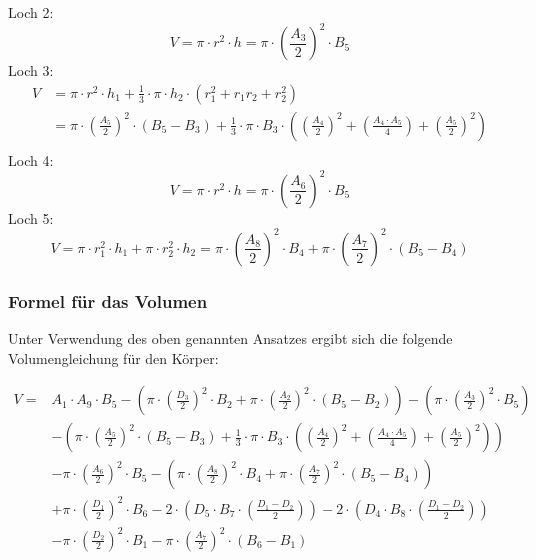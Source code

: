 Loch 2:
  \begin{equation}
    V = \pi\cdot r^{2} \cdot h = \pi \cdot \left(\frac{A_3}{2} \right)^2 \cdot B_5 
  \end{equation}
Loch 3:
  \begin{equation}
    \begin{split}
    V &= \pi\cdot r^{2} \cdot h_1 + \frac{1}{3} \cdot \pi \cdot h_2 \cdot(r_1^2 + r_1 r_2 + r_2^2) \\
    &= \pi \cdot \left(\frac{A_5}{2} \right)^2 \cdot (B_5 - B_3) + \frac{1}{3} \cdot \pi \cdot B_3 \cdot \left(\left(\frac{A_4}{2}\right)^2 + \left(\frac{A_4 \cdot A_5}{4}\right)+ \left(\frac{A_5}{2}\right)^2\right)\\
    \end{split}
  \end{equation}
Loch 4:
  \begin{equation}
     V = \pi\cdot r^{2} \cdot h = \pi \cdot \left(\frac{A_6}{2} \right)^2 \cdot B_5 
  \end{equation}
Loch 5:
  \begin{equation}
    V = \pi\cdot r_1^{2} \cdot h_1 + \pi\cdot r_2^{2} \cdot h_2 = \pi \cdot \left(\frac{A_8}{2} \right)^2 \cdot B_4 + \pi \cdot \left(\frac{A_7}{2} \right)^2 \cdot (B_5 - B_4)
  \end{equation}


\subsubsection*{Formel für das Volumen}
Unter Verwendung des oben genannten Ansatzes ergibt sich die folgende Volumengleichung für den Körper: 
 
\begin{equation}
  \begin{split}
    V =& A_1 \cdot A_9 \cdot B_5 - (\pi \cdot \left(\frac{D_3}{2} \right)^2 \cdot B_2 + \pi \cdot \left(\frac{A_2}{2} \right)^2 \cdot (B_5 - B_2)) - (\pi \cdot \left(\frac{A_3}{2} \right)^2 \cdot B_5) \\
    &- ( \pi \cdot \left(\frac{A_5}{2} \right)^2 \cdot (B_5 - B_3) + \frac{1}{3} \cdot \pi \cdot B_3 \cdot \left(\left(\frac{A_4}{2}\right)^2 + \left(\frac{A_4 \cdot A_5}{4}\right)+ \left(\frac{A_5}{2}\right)^2\right)) \\
    &- \pi \cdot \left(\frac{A_6}{2} \right)^2 \cdot B_5 - (\pi \cdot \left(\frac{A_8}{2} \right)^2 \cdot B_4 + \pi \cdot \left(\frac{A_7}{2} \right)^2 \cdot (B_5 - B_4)) \\
    &+ \pi \cdot \left(\frac{D_1}{2} \right)^2 \cdot B_6 - 2 \cdot ( D_5 \cdot B_7 \cdot\left(\frac{D_1 - D_2 }{2} \right)) - 2 \cdot (D_4 \cdot B_8 \cdot\left(\frac{D_1 - D_2 }{2} \right)) \\
    &- \pi \cdot \left(\frac{D_2}{2} \right)^2 \cdot B_1 - \pi \cdot \left(\frac{A_7}{2} \right)^2 \cdot (B_6 - B_1) \\
  \end{split}
\end{equation}

